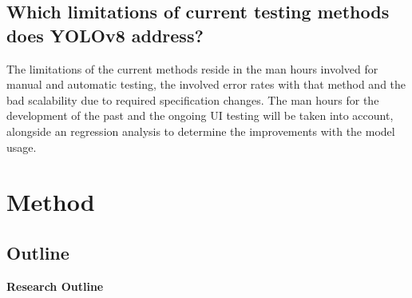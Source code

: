 \documentclass[Proposal,BIC,english,fhCitStyle,IEEE]{BASE/twbook} %
\begin{document}
\section{Which limitations of current testing methods does YOLOv8 address?}
The limitations of the current methods reside in the man hours involved for manual and automatic testing, the involved error rates with that method and the bad scalability due to required specification changes.
The man hours for the development of the past and the ongoing UI testing will be taken into account, alongside an regression analysis to determine the improvements with the model usage.

\chapter{Method}
\section{Outline}
\begin{center}
    \Large{\textbf{Research Outline}}
\end{center}

\vspace{1cm} %
\end{document}
